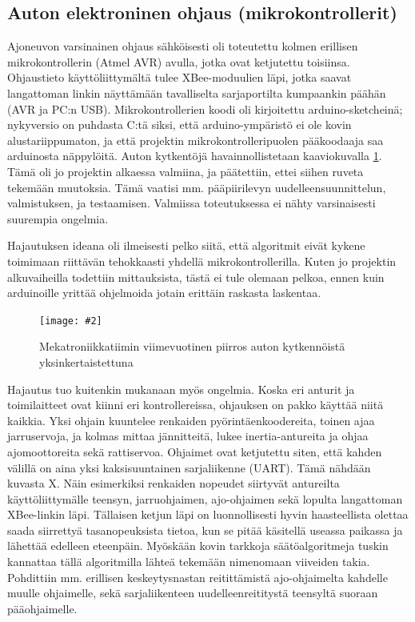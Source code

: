 \documentclass{article}
\newcommand{\kuvaa}[4]{%
	\begin{figure}[h]%
		\centering \texttt{[image: \#2]}%
		\caption{#3 \label{fig:#4}}%
	\end{figure}%
}
\begin{document}
\subsection{Auton elektroninen ohjaus (mikrokontrollerit)}

Ajoneuvon varsinainen ohjaus sähköisesti oli toteutettu kolmen erillisen mikrokontrollerin (Atmel AVR) avulla, jotka ovat ketjutettu toisiinsa. Ohjaustieto käyttöliittymältä tulee XBee-moduulien läpi, jotka saavat langattoman linkin näyttämään tavalliselta sarjaportilta kumpaankin päähän (AVR ja PC:n USB). Mikrokontrollerien koodi oli kirjoitettu arduino-sketcheinä; nykyversio on puhdasta C:tä siksi, että arduino-ympäristö ei ole kovin alustariippumaton, ja että projektin mikrokontrolleripuolen pääkoodaaja saa arduinosta näppylöitä. Auton kytkentöjä havainnollistetaan kaaviokuvalla \ref{fig:elektroniikka}. Tämä oli jo projektin alkaessa valmiina, ja päätettiin, ettei siihen ruveta tekemään muutoksia. Tämä vaatisi mm. pääpiirilevyn uudelleensuunnittelun, valmistuksen, ja testaamisen. Valmiissa toteutuksessa ei nähty varsinaisesti suurempia ongelmia.

Hajautuksen ideana oli ilmeisesti pelko siitä, että algoritmit eivät kykene toimimaan riittävän tehokkaasti yhdellä mikrokontrollerilla. Kuten jo projektin alkuvaiheilla todettiin mittauksista, tästä ei tule olemaan pelkoa, ennen kuin arduinoille yrittää ohjelmoida jotain erittäin raskasta laskentaa.

\kuvaa{0.8}{elektroniikka}{Mekatroniikkatiimin viimevuotinen piirros auton kytkennöistä yksinkertaistettuna}{elektroniikka}

Hajautus tuo kuitenkin mukanaan myös ongelmia. Koska eri anturit ja toimilaitteet ovat kiinni eri kontrollereissa, ohjauksen on pakko käyttää niitä kaikkia. Yksi ohjain kuuntelee renkaiden pyörintäenkoodereita, toinen ajaa jarruservoja, ja kolmas mittaa jännitteitä, lukee inertia-antureita ja ohjaa ajomoottoreita sekä rattiservoa. Ohjaimet ovat ketjutettu siten, että kahden välillä on aina yksi kaksisuuntainen sarjaliikenne (UART). Tämä nähdään kuvasta X. Näin esimerkiksi renkaiden nopeudet siirtyvät antureilta käyttöliittymälle teensyn, jarruohjaimen, ajo-ohjaimen sekä lopulta langattoman XBee-linkin läpi. Tällaisen ketjun läpi on luonnollisesti hyvin haasteellista olettaa saada siirrettyä tasanopeuksista tietoa, kun se pitää käsitellä useassa paikassa ja lähettää edelleen eteenpäin. Myöskään kovin tarkkoja säätöalgoritmeja tuskin kannattaa tällä algoritmilla lähteä tekemään nimenomaan viiveiden takia. Pohdittiin mm. erillisen keskeytysnastan reitittämistä ajo-ohjaimelta kahdelle muulle ohjaimelle, sekä sarjaliikenteen uudelleenreititystä teensyltä suoraan pääohjaimelle.
\end{document}
